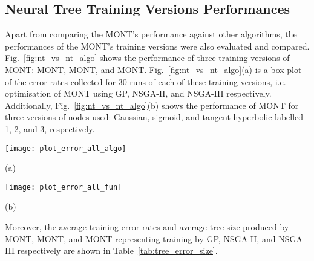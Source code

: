 \documentclass[conference]{IEEEtran}
\begin{document}
\begin{table*}
\subsection{Neural Tree Training Versions Performances}
\label{sec:res_nt_vs_nt}
Apart from comparing the MONT's performance against other algorithms, the performances of the MONT's training versions were also evaluated and compared. Fig.~\ref{fig:nt_vs_nt_algo} shows the performance of three training versions of MONT: MONT, MONT, and MONT. Fig.~\ref{fig:nt_vs_nt_algo}(a) is a box plot of the error-rates collected for 30 runs of each of these training versions, i.e. optimisation of MONT using GP, NSGA-II, and NSGA-III respectively. Additionally, Fig.~\ref{fig:nt_vs_nt_algo}(b) shows the performance of MONT for three versions of nodes used: Gaussian, sigmoid, and tangent hyperbolic labelled 1, 2, and 3, respectively.    
\begin{figure*}
    \centering
    \centerline{\texttt{[image: plot\_error\_all\_algo]}}
    (a)
    \centerline{\texttt{[image: plot\_error\_all\_fun]}}
    (b)
    \caption{Performance of neural tree training versions: (a) Performance of optimisers GP, NSGA-II, and NSGA-III respectively marked 1, 2, and 3 as the subscript of the dataset names. (b) Performance of for activation functions at neural nodes: Gaussian, sigmoid, and tanh respectively marked 1, 2, and 3 as the subscript of dataset names. The median of error-rates is marked in red; the average error-rate is marked in a green triangle.} 
    \label{fig:nt_vs_nt_algo}
\end{figure*}

Moreover, the average training error-rates and average tree-size produced by  MONT, MONT, and MONT representing training by GP, NSGA-II, and NSGA-III respectively are shown in Table~\ref{tab:tree_error_size}.


\end{table*}
\end{document}
